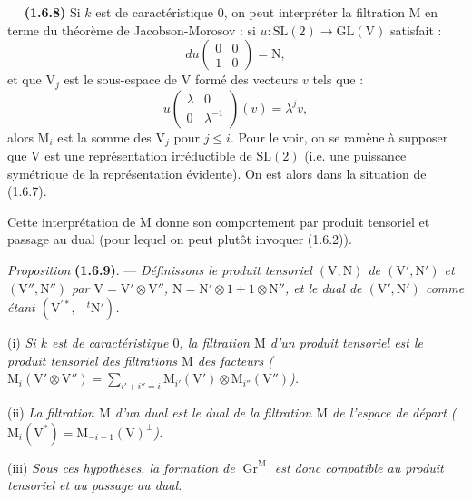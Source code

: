 \documentclass[11pt,leqno]{article}
\newcommand{\Page}[1]{\ifvmode\noindent\else\unskip\ \fi{\footnotesize\textcolor{gray}{[p.\,#1]}}\ \ignorespaces}
\begin{document}
\Page{167}
\textbf{(1.6.8)} Si \(k\) est de caractéristique \(0\), on peut interpréter la filtration \(\mathrm{M}\) en terme du théorème de Jacobson-Morosov : si \(u:\mathrm{SL}(2)\to\mathrm{GL}(\mathrm{V})\) satisfait :
\[
du\begin{pmatrix}0&0\\1&0\end{pmatrix}=\mathrm{N},
\]
et que \(\mathrm{V}_j\) est le sous-espace de \(\mathrm{V}\) formé des vecteurs \(v\) tels que :
\[
u\begin{pmatrix}\lambda&0\\0&\lambda^{-1}\end{pmatrix}(v)=\lambda^jv,
\]
alors \(\mathrm{M}_i\) est la somme des \(\mathrm{V}_j\) pour \(j\le i\). Pour le voir, on se ramène à supposer que \(\mathrm{V}\) est une représentation irréductible de \(\mathrm{SL}(2)\) (i.e. une puissance symétrique de la représentation évidente). On est alors dans la situation de (1.6.7).

Cette interprétation de \(\mathrm{M}\) donne son comportement par produit tensoriel et passage au dual (pour lequel on peut plutôt invoquer (1.6.2)).

\textit{Proposition} \textbf{(1.6.9)}. — \textit{Définissons le produit tensoriel \((\mathrm{V},\mathrm{N})\) de \((\mathrm{V}',\mathrm{N}')\) et \((\mathrm{V}'',\mathrm{N}'')\) par \(\mathrm{V}=\mathrm{V}'\otimes\mathrm{V}''\), \(\mathrm{N}=\mathrm{N}'\otimes1+1\otimes\mathrm{N}''\), et le dual de \((\mathrm{V}',\mathrm{N}')\) comme étant \((\mathrm{V}^{\prime *},-{}^t\mathrm{N}')\).}

(i) \textit{Si \(k\) est de caractéristique \(0\), la filtration \(\mathrm{M}\) d’un produit tensoriel est le produit tensoriel des filtrations \(\mathrm{M}\) des facteurs (\(\mathrm{M}_i(\mathrm{V}'\otimes\mathrm{V}'')=\sum\limits_{i'+i''=i}\mathrm{M}_{i'}(\mathrm{V}')\otimes\mathrm{M}_{i''}(\mathrm{V}'')\)).}

(ii) \textit{La filtration \(\mathrm{M}\) d’un dual est le dual de la filtration \(\mathrm{M}\) de l’espace de départ (\(\mathrm{M}_i(\mathrm{V}^*)=\mathrm{M}_{-i-1}(\mathrm{V})^\perp\)).}

(iii) \textit{Sous ces hypothèses, la formation de \(\operatorname{Gr}^{\mathrm{M}}\) est donc compatible au produit tensoriel et au passage au dual.}
\end{document}
